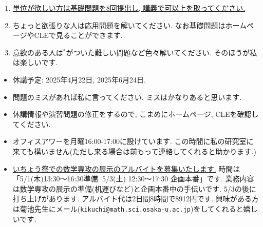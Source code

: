 \documentclass[dvipdfmx,a4paper,11pt]{article}
\theoremstyle{definition}
\begin{document}


\medskip
{}
\begin{enumerate}
  \setlength{\parskip}{0cm} 
  \setlength{\itemsep}{0cm} 
\item \underline{単位が欲しい方は基礎問題を8回提出し, 講義で可以上を取ってください.} %
\item ちょっと欲張りな人は応用問題を解いてください. なお基礎問題はホームページやCLEで見ることができます.
\item 意欲のある人は$^{*}$がついた難しい問題など色々解いてください. そのほうが私は楽しいです.
\end{enumerate}




\medskip
{}
\begin{itemize}
  \setlength{\parskip}{0cm} %
  \setlength{\itemsep}{0cm} %
  \item 休講予定: 2025年4月22日, 2025年6月24日. 
    \item 問題のミスがあれば私に言ってください. ミスはかなりあると思います. 
  \item 休講情報や演習問題の修正をするので, こまめにホームページ, CLEを確認してください.
    \item オフィスアワーを月曜16:00-17:00に設けています. この時間に私の研究室に来ても構いません(ただし来る場合は前もって連絡してくれると助かります.)
      \item \underline{いちょう祭での数学専攻の展示のアルバイトを募集いたします.} 時間は「5/1(木)13:30〜16:30準備. 5/3(土) 12:30〜17:30 企画本番」です. 業務内容は数学専攻の展示の準備(机運びなど)と企画本番中の手伝いです. 5/3の後に打ち上げがあります. アルバイト代は2日間8時間で8912円です. 興味がある方は菊池先生にメール(\texttt{kikuchi@math.sci.osaka-u.ac.jp})をしてくれると嬉しいです. 
 \end{itemize}
 
\end{document}
